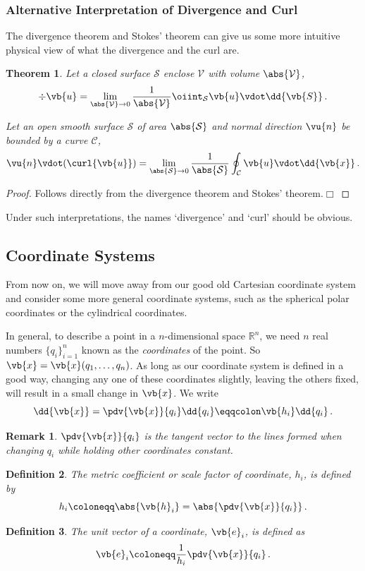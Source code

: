 \documentclass{article}
\theoremstyle{plain}\theoremheaderfont{\normalfont\itshape}\theorembodyfont{\rmfamily}\theoremseparator{.}\newtheorem*{rem}{Remark}\newtheorem*{ex}{Example}\newtheorem*{proof}{Proof}\newtheorem*{altp}{Alternative proof}
\theoremstyle{plain}\theoremheaderfont{\normalfont\bfseries}\theorembodyfont{\rmfamily}\theoremseparator{.}\newtheorem{thm}{Theorem}[section]\newtheorem{lem}[thm]{Lemma}\newtheorem{prop}[thm]{Proposition}\newtheorem*{cor}{Corollary}\newtheorem{defn}[thm]{Definition}\newtheorem{clm}[thm]{Claim}\newtheorem{clminproof}{Claim}
\theoremstyle{break}\theoremheaderfont{\normalfont\itshape}\theorembodyfont{\rmfamily}\theoremseparator{.\medskip}\newtheorem*{proofskip}{Proof}\newtheorem*{exs}{Examples}\newtheorem*{rems}{Remarks}
\theoremstyle{break}\theoremheaderfont{\normalfont\bfseries}\theorembodyfont{\rmfamily}\theoremseparator{.\medskip}\newtheorem{lemskip}[thm]{Lemma}\newtheorem{defnskip}[thm]{Definition}\newtheorem{propskip}[thm]{Proposition}\newtheorem{thmskip}[thm]{Theorem}
\numberwithin{equation}{section}
\newcommand{\qed}{\hfill\ensuremath{\Box}}
\begin{document}
	\subsubsection{Alternative Interpretation of Divergence and Curl}
	The divergence theorem and Stokes' theorem can give us some more intuitive physical view of what the divergence and the curl are.
	\begin{thm}\label{altdivcurl}
		Let a closed surface \(\mathcal{S}\) enclose \(\mathcal{V}\) with volume \(\abs{\mathcal{V}}\),
		\[\div{\vb{u}}=\lim_{\abs{\mathcal{V}}\to 0}\frac{1}{\abs{\mathcal{V}}}\oiint_{\mathcal{S}}\vb{u}\vdot\dd{\vb{S}}\,.\]
	
		Let an open smooth surface \(\mathcal{S}\) of area \(\abs{\mathcal{S}}\) and normal direction \(\vu{n}\) be bounded by a curve \(\mathcal{C}\),
		\[\vu{n}\vdot(\curl{\vb{u}})=\lim_{\abs{\mathcal{S}}\to 0}\frac{1}{\abs{\mathcal{S}}}\oint_{\mathcal{C}}\vb{u}\vdot\dd{\vb{x}}\,.\]
	\end{thm}
	\begin{proof}
		Follows directly from the divergence theorem and Stokes' theorem.\qed
	\end{proof}
	Under such interpretations, the names `divergence' and `curl' should be obvious.

	\subsection{Coordinate Systems}
	From now on, we will move away from our good old Cartesian coordinate system and consider some more general coordinate systems, such as the spherical polar coordinates or the cylindrical coordinates.

	In general, to describe a point in a \(n\)-dimensional space \(\mathbb{R}^n\), we need \(n\) real numbers \(\{q_i\}_{i=1}^{n}\) known as the \textit{coordinates} of the point. So \(\vb{x}=\vb{x}(q_1,\dots,q_n)\). As long as our coordinate system is defined in a good way, changing any one of these coordinates slightly, leaving the others fixed, will result in a small change in \(\vb{x}\). We write
	\[\dd{\vb{x}}=\pdv{\vb{x}}{q_i}\dd{q_i}\eqqcolon \vb{h_i}\dd{q_i}\,.\]
	\begin{rem}
		\(\pdv{\vb{x}}{q_i}\) is the tangent vector to the lines formed when changing \(q_i\) while holding other coordinates constant.
	\end{rem}
	\begin{defn}
		The \textit{metric coefficient} or \textit{scale factor} of coordinate, \(h_i\), is defined by
		\[h_i\coloneqq\abs{\vb{h}_i}=\abs{\pdv{\vb{x}}{q_i}}\,.\]
	\end{defn}
	\begin{defn}
		The \textit{unit vector} of a coordinate, \(\vb{e}_i\), is defined as
		\[\vb{e}_i\coloneqq\frac{1}{h_i}\pdv{\vb{x}}{q_i}\,.\]
	\end{defn}
\end{document}
